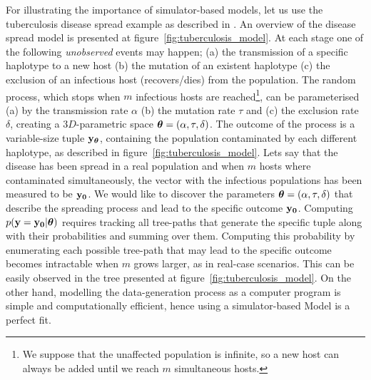 For illustrating the importance of simulator-based models, let us use
the tuberculosis disease spread example as described in
\autocite{Tanaka2006}. An overview of the disease spread model is
presented at figure~\ref{fig:tuberculosis_model}. At each stage one of
the following \textit{unobserved} events may happen; (a) the
transmission of a specific haplotype to a new host (b) the mutation of
an existent haplotype (c) the exclusion of an infectious host
(recovers/dies) from the population. The random process, which stops
when $m$ infectious hosts are reached\footnote{We suppose that the
  unaffected population is infinite, so a new host can always be added
  until we reach $m$ simultaneous hosts.}, can be parameterised (a) by
the transmission rate $\alpha$ (b) the mutation rate $\tau$ and (c)
the exclusion rate $\delta$, creating a $3D$-parametric space
$\boldsymbol{\theta} = (\alpha, \tau, \delta)$. The outcome of the process is a
variable-size tuple $\mathbf{y}_{\boldsymbol{\theta}}$, containing the population
contaminated by each different haplotype, as described in
figure~\ref{fig:tuberculosis_model}. Lets say that the disease has
been spread in a real population and when $m$ hosts where contaminated
simultaneously, the vector with the infectious populations has been
measured to be $\mathbf{y_0}$. We would like to discover the parameters
$\boldsymbol{\theta} = (\alpha, \tau, \delta)$ that describe the spreading process
and lead to the specific outcome $\mathbf{y_0}$. Computing
$p(\mathbf{y}=\mathbf{y_0}|\boldsymbol{\theta})$ requires tracking all tree-paths that generate
the specific tuple along with their probabilities and summing over
them. Computing this probability by enumerating each possible
tree-path that may lead to the specific outcome becomes intractable
when $m$ grows larger, as in real-case scenarios. This can be easily
observed in the tree presented at
figure~\ref{fig:tuberculosis_model}. On the other hand, modelling the
data-generation process as a computer program is simple and
computationally efficient, hence using a simulator-based Model is a
perfect fit.

